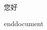 \documentclass{article}
\begin{document}
\begin{CJK}{UTF8}{song}
	您好
\end{CJK}
end{document}
\end{document}
